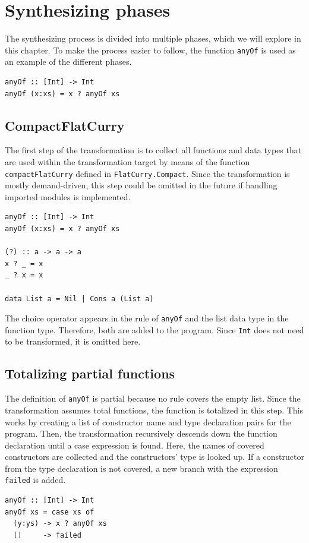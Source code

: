 \documentclass[a4paper, 11pt, fleqn]{scrreprt}
\newcommand{\cinline}[1]{\texttt{#1}}
\begin{document}
\section{Synthesizing phases}
The synthesizing process is divided into multiple phases, which we will explore in this chapter. To make the process easier to follow, the function \cinline{anyOf} is used as an example of the different phases.
\begin{verbatim}
anyOf :: [Int] -> Int
anyOf (x:xs) = x ? anyOf xs
\end{verbatim}

\subsection{CompactFlatCurry}
The first step of the transformation is to collect all functions and data types that are used within the transformation target by means of the function \cinline{compactFlatCurry} defined in \cinline{FlatCurry.Compact}. Since the transformation is mostly demand-driven, this step could be omitted in the future if handling imported modules is implemented.
\begin{verbatim}
anyOf :: [Int] -> Int
anyOf (x:xs) = x ? anyOf xs

(?) :: a -> a -> a
x ? _ = x
_ ? x = x

data List a = Nil | Cons a (List a)
\end{verbatim}
The choice operator appears in the rule of \cinline{anyOf} and the list data type in the function type. Therefore, both are added to the program. Since \cinline{Int} does not need to be transformed, it is omitted here.

\subsection{Totalizing partial functions}
The definition of \cinline{anyOf} is partial because no rule covers the empty list. Since the transformation assumes total functions, the function is totalized in this step. This works by creating a list of  constructor name and type declaration pairs for the program. Then, the transformation recursively descends down the function declaration until a case expression is found. Here, the names of covered constructors are collected and the constructors' type is looked up. If a constructor from the type declaration is not covered, a new branch with the expression \cinline{failed} is added.
\begin{verbatim}
anyOf :: [Int] -> Int
anyOf xs = case xs of
  (y:ys) -> x ? anyOf xs
  []     -> failed
\end{verbatim}
\end{document}
